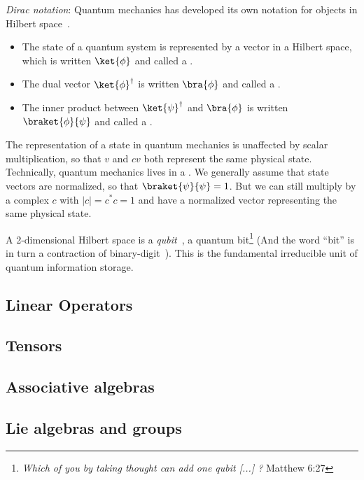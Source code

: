 {\sl Dirac notation}: Quantum mechanics has developed its own notation for objects in Hilbert space~\cite{Dirac???}. 
 \begin{itemize}
 \item The state of a quantum system is represented by a vector in a Hilbert space, which is written $\ket{\phi}$ and called a .
  \item The dual vector $\ket{\phi}^\dagger$  is written $\bra{\phi}$ and called a .
  \item The inner product between $\ket{\psi}^\dagger$ and $\bra{\phi}$ is written $\braket{\phi}{\psi}$ and called a . 
 \end{itemize}
The representation of a state in quantum mechanics is unaffected by scalar multiplication, so that $v$ and $cv$ both represent the same physical state. Technically, quantum mechanics  lives in a . We generally assume that state vectors are normalized, so that $\braket{\psi}{\psi}=1$. But we can still multiply by a complex  $c$ with $|c| = c^*c = 1$ and have a  normalized vector representing the same physical state.  

A 2-dimensional Hilbert space is a {\sl qubit}~\cite{???}, a quantum bit\footnote{{\sl
Which of you by taking thought can add one qubit [...] ?} Matthew 6:27} (And the word ``bit'' is in turn a contraction of binary-digit~\cite{???}). This is the fundamental irreducible unit of quantum information storage.


\subsection{Linear Operators}


\subsection{Tensors}


\subsection{Associative algebras}



\subsection{Lie algebras and groups}



